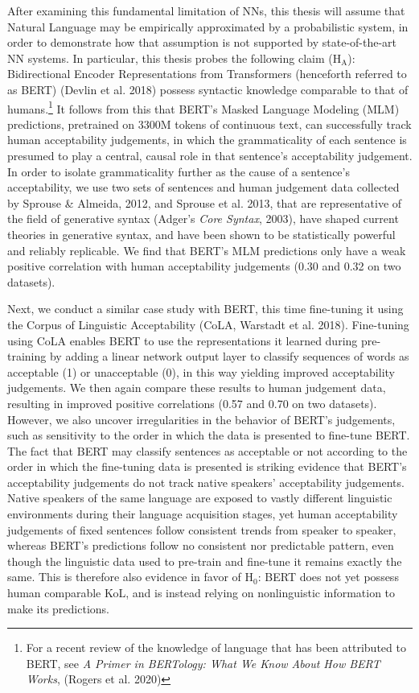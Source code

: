 After examining this fundamental limitation of NNs, this thesis will assume that Natural Language may be empirically approximated by a probabilistic system, in order to demonstrate how that assumption is not supported by state-of-the-art NN systems.  In particular, this thesis probes the following claim ($\mathrm{H}_\mathrm{A}$): Bidirectional Encoder Representations from Transformers (henceforth referred to as BERT) (Devlin et al. 2018) possess syntactic knowledge comparable to that of humans.\footnote{For a recent review of the knowledge of language that has been attributed to BERT, see \textit{A Primer in BERTology: What We Know About How BERT Works}, (Rogers et al. 2020)} It follows from this that BERT's Masked Language Modeling (MLM) predictions, pretrained on 3300M tokens of continuous text, can successfully track human acceptability judgements, in which the grammaticality of each sentence is presumed to play a central, causal role in that sentence's acceptability judgement.  In order to isolate grammaticality further as the cause of a sentence's acceptability, we use two sets of sentences and human judgement data collected by Sprouse & Almeida, 2012, and Sprouse et al. 2013, that are representative of the field of generative syntax (Adger's \textit{Core Syntax}, 2003), have shaped current theories in generative syntax, and have been shown to be statistically powerful and reliably replicable.  We find that BERT's MLM predictions only have a weak positive correlation with human acceptability judgements (0.30 and 0.32 on two datasets).

Next, we conduct a similar case study with BERT, this time fine-tuning it using the Corpus of Linguistic Acceptability (CoLA, Warstadt et al. 2018).  Fine-tuning using CoLA enables BERT to use the representations it learned during pre-training by adding a linear network output layer to classify sequences of words as acceptable (1) or unacceptable (0), in this way yielding improved acceptability judgements.  We then again compare these results to human judgement data, resulting in improved positive correlations (0.57 and 0.70 on two datasets).  However, we also uncover irregularities in the behavior of BERT's judgements, such as sensitivity to the order in which the data is presented to fine-tune BERT.  The fact that BERT may classify sentences as acceptable or not according to the order in which the fine-tuning data is presented is striking evidence that BERT's acceptability judgements do not track native speakers' acceptability judgements.  Native speakers of the same language are exposed to vastly different linguistic environments during their language acquisition stages, yet human acceptability judgements of fixed sentences follow consistent trends from speaker to speaker, whereas BERT's predictions follow no consistent nor predictable pattern, even though the linguistic data used to pre-train and fine-tune it remains exactly the same.  This is therefore also evidence in favor of $\mathrm{H}_0$: BERT does not yet possess human comparable KoL, and is instead relying on nonlinguistic information to make its predictions.

